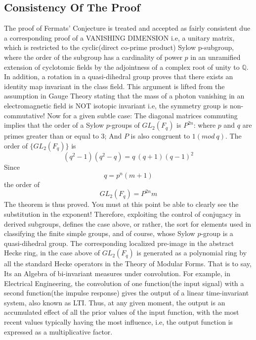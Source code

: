 \documentclass[11pt,fancy]{elegantbook}
\begin{document}
\subsection{Consistency Of The Proof}
The proof of Fermats' Conjecture is treated and accepted as fairly consistent due a corresponding proof of a VANISHING DIMENSION i.e, a unitary matrix, which is restricted to the cyclic(direct co-prime product) Sylow p-subgroup, where the order of the subgroup has a cardinality of power $p$ in an unramified extension of cyclotomic fields by the adjointness of a complex root of unity to ${\mathbb{Q}}$. In addition, a rotation in a quasi-dihedral group proves that there exists an identity map invariant in the class field. 
This argument is lifted from the assumption in Gauge Theory stating that the mass of a photon vanishing in an electromagnetic field is NOT isotopic invariant i.e, the symmetry group is non-commutative! 
Now for a given subtle case:
The diagonal matrices commuting implies that the order of a Sylow $p$-groups of ${GL_2(F_q)}$ is ${{P}^{2n}}$:
where $p$ and $q$ are primes greater than or equal to 3; And $P$ is also congruent to ${1(mod\ q)}$. The order of $\{GL_2(F_q)\}$ is 
\begin{equation}
(q^2 - 1)(q^2 - q) = q \ (q + 1)(q - 1)^2
\end{equation}
Since 
\begin{equation}
    q = p^n(m + 1)
\end{equation}
the order of
\begin{equation}
    GL_2(F_q) = P^{2n}{m}
\end{equation}
The theorem is thus proved. You must at this point be able to clearly see the substitution in the exponent! Therefore, exploiting the control of conjugacy in derived subgroups, defines the case above, or rather, the sort for elements used in classifying the finite simple groups, and of course, whose Sylow $p$-group is a quasi-dihedral group.
The corresponding localized pre-image in the abstract Hecke ring, in the case above of ${GL_2(F_q)}$ is generated as a polynomial ring by all the standard Hecke operators in the Theory of Modular Forms. That is to say, Its an Algebra of bi-invariant measures under convolution. For example, in Electrical Engineering, the convolution of one function(the input signal) with a second function(the impulse response) gives the output of a linear time-invariant system, also known as LTI. Thus, at any given moment, the output is an accumulated effect of all the prior values of the input function, with the most recent values typically having the most influence, i.e, the output function is expressed as a multiplicative factor.
\end{document}
